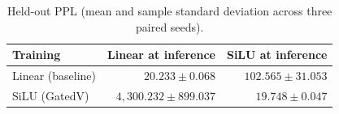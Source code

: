 \documentclass[11pt,a4paper]{article}
\begin{document}
\begin{table}[htbp]
\centering\small
\caption{Held-out PPL (mean and sample standard deviation across three paired seeds).}
\label{tab:cross_eval}
\begin{tabular}{lrr}
\toprule
Training & Linear at inference & SiLU at inference\\
\midrule
Linear (baseline) & $20.233\pm0.068$ & $102.565\pm31.053$\\
SiLU (GatedV) & $4{,}300.232\pm899.037$ & $19.748\pm0.047$\\
\bottomrule
\end{tabular}
\end{table}
\FloatBarrier



\end{document}
